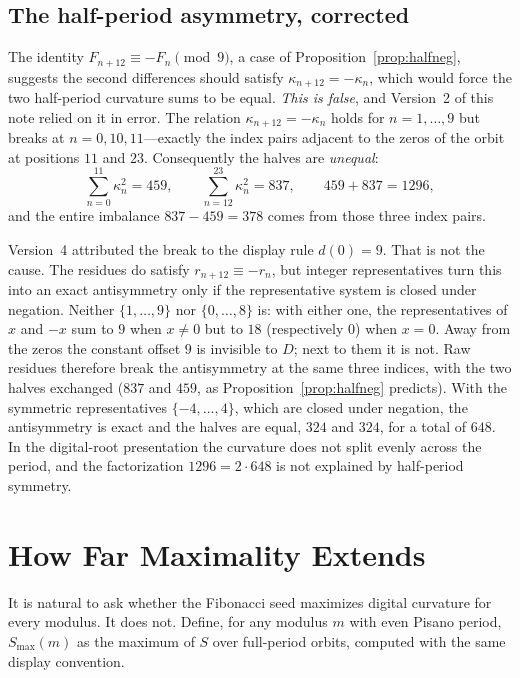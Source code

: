 \documentclass[12pt]{article}
\theoremstyle{remark}
\begin{document}
\subsection{The half-period asymmetry, corrected}\label{sec:halves}

The identity $F_{n+12}\equiv -F_n\pmod 9$, a case of Proposition~\ref{prop:halfneg},
suggests the second differences should satisfy $\kappa_{n+12}=-\kappa_n$, which would force the two
half-period curvature sums to be equal. \emph{This is false}, and Version~2 of this note
relied on it in error. The relation $\kappa_{n+12}=-\kappa_n$ holds for $n=1,\dots,9$ but
breaks at $n=0,10,11$---exactly the index pairs adjacent to the zeros of the orbit at
positions $11$ and $23$. Consequently the halves are \emph{unequal}:
\[
\sum_{n=0}^{11}\kappa_n^2=459,\qquad \sum_{n=12}^{23}\kappa_n^2=837,\qquad 459+837=1296,
\]
and the entire imbalance $837-459=378$ comes from those three index pairs.

Version~4 attributed the break to the display rule $d(0)=9$. That is not the cause. The
residues do satisfy $r_{n+12}\equiv -r_n$, but integer representatives turn this into an
exact antisymmetry only if the representative system is closed under negation. Neither
$\{1,\dots,9\}$ nor $\{0,\dots,8\}$ is: with either one, the representatives of $x$ and
$-x$ sum to $9$ when $x\ne 0$ but to $18$ (respectively $0$) when $x=0$. Away from the
zeros the constant offset $9$ is invisible to $D$; next to them it is not. Raw residues
therefore break the antisymmetry at the same three indices, with the two halves exchanged
($837$ and $459$, as Proposition~\ref{prop:halfneg} predicts). With the symmetric
representatives $\{-4,\dots,4\}$, which are closed under negation, the antisymmetry is
exact and the halves are equal, $324$ and $324$, for a total of $648$. In the digital-root
presentation the curvature does not split evenly across the period, and the factorization
$1296=2\cdot 648$ is not explained by half-period symmetry.

\section{How Far Maximality Extends}\label{sec:maximality}

It is natural to ask whether the Fibonacci seed maximizes digital curvature for every
modulus. It does not. Define, for any modulus $m$ with even Pisano period, $S_{\max}(m)$ as
the maximum of $S$ over full-period orbits, computed with the same display convention.
\end{document}

